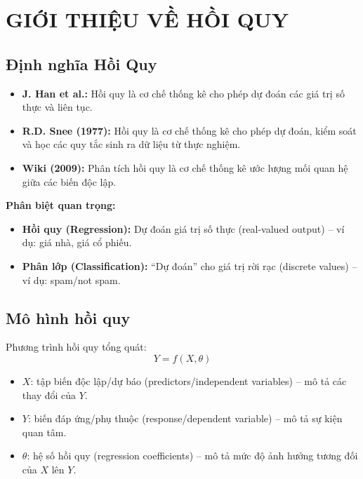 \documentclass[10pt]{article}
\begin{document}
\onehalfspacing
\renewcommand{\arraystretch}{1.5}

\newcommand{\ChapterNum}{3}
\newcommand{\ChapterTitle}{HỒI QUY DỮ LIỆU (DATA REGRESSION)}


\section{GIỚI THIỆU VỀ HỒI QUY}

\subsection{Định nghĩa Hồi Quy}

\begin{itemize}
    \item \textbf{J. Han et al.:} Hồi quy là cơ chế thống kê cho phép dự đoán các giá trị số thực và liên tục.
    \item \textbf{R.D. Snee (1977):} Hồi quy là cơ chế thống kê cho phép dự đoán, kiểm soát và học các quy tắc sinh ra dữ liệu từ thực nghiệm.
    \item \textbf{Wiki (2009):} Phân tích hồi quy là cơ chế thống kê ước lượng mối quan hệ giữa các biến độc lập.
\end{itemize}

\textbf{Phân biệt quan trọng:}
\begin{itemize}
    \item \textbf{Hồi quy (Regression):} Dự đoán giá trị số thực (real-valued output) -- ví dụ: giá nhà, giá cổ phiếu.
    \item \textbf{Phân lớp (Classification):} ``Dự đoán'' cho giá trị rời rạc (discrete values) -- ví dụ: spam/not spam.
\end{itemize}

\subsection{Mô hình hồi quy}

Phương trình hồi quy tổng quát:
\[
Y = f(X, \theta)
\]
\begin{itemize}
    \item $X$: tập biến độc lập/dự báo (predictors/independent variables) -- mô tả các thay đổi của $Y$.
    \item $Y$: biến đáp ứng/phụ thuộc (response/dependent variable) -- mô tả sự kiện quan tâm.
    \item $\theta$: hệ số hồi quy (regression coefficients) -- mô tả mức độ ảnh hưởng tương đối của $X$ lên $Y$.
\end{itemize}
\end{document}
